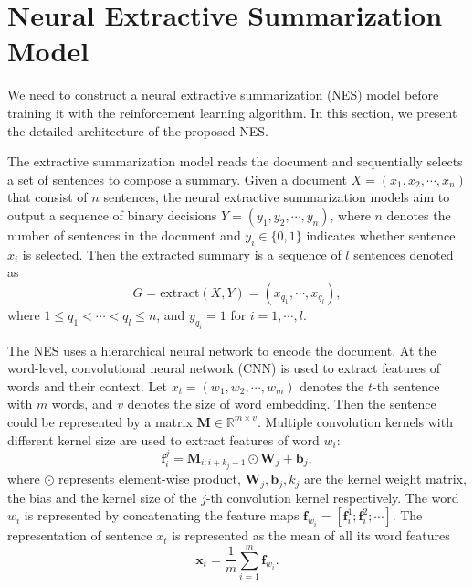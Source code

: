 \documentclass[letterpaper]{article} %
\begin{document}
	\section{Neural Extractive Summarization Model}
	
	We need to construct a neural extractive summarization (NES) model before training it with the reinforcement learning algorithm. In this section, we present the detailed architecture of the proposed NES.  
	
	
	The extractive summarization model reads the document and sequentially selects a set of sentences to compose a summary. Given a document $X=(x_1, x_2, \cdots, x_n)$ that consist of $n$ sentences, the neural extractive summarization models aim to output a sequence of binary decisions $Y=(y_1, y_2, \cdots, y_n)$, where $n$ denotes the number of sentences in the document and $y_i \in \{0,1\}$ indicates whether sentence $x_i$ is selected. Then the extracted summary is a sequence of $l$ sentences denoted as
	\[G=\text{extract}(X, Y)=(x_{q_1}, \cdots, x_{q_l}),\]
	where $1\leq q_1 < \cdots < q_l \leq n$, and $y_{q_i} = 1$ for $i=1,\cdots,l$.
	
	The NES uses a hierarchical neural network to encode the document. At the word-level, convolutional neural network (CNN) is used to extract features of words and their context. Let $x_t=(w_1, w_2, \cdots, w_m)$ denotes the $t$-th sentence with $m$ words, and $v$ denotes the size of word embedding. Then the sentence could be represented by a matrix $\mathbf{M} \in \mathbb{R}^{m \times v}$. Multiple convolution kernels with different kernel size are used to extract features of word $w_i$:
	$$\mathbf{f}_i^j = \mathbf{M}_{i:i+k_j-1} \odot \mathbf{W}_j + \mathbf{b}_j ,$$
	where $\odot$ represents element-wise product, $\mathbf{W}_j, \mathbf{b}_j, k_j$ are the kernel weight matrix, the bias and the kernel size of the $j$-th convolution kernel respectively. The word $w_i$ is represented by concatenating the feature maps $\mathbf{f}_{w_i}=[\mathbf{f}_i^1 ; \mathbf{f}_i^2 ; \cdots]$. The representation of sentence $x_t$ is represented as the mean of all its word features
	$$ \mathbf{x}_t = \frac{1}{m} \sum_{i=1}^m \mathbf{f}_{w_i} .$$
	
\end{document}
